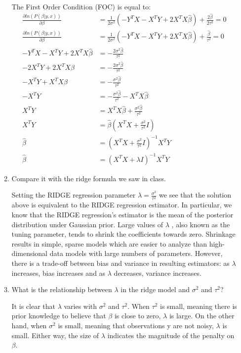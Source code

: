 \documentclass[12pt]{article}
\begin{document}
\begin{enumerate}
\begin{enumerate}
The First Order Condition (FOC) is equal to:
\begin{align*}
\frac{\partial ln(P(\beta|y,x))}{\partial \beta} &= \frac{1}{2\sigma^2}(-Y^{T}X - X^{T}Y + 2X^{T}X\hat\beta) + \frac{2\hat\beta}{2\tau^2} = 0 \\
\frac{\partial ln(P(\beta|y,x))}{\partial \beta} &= \frac{1}{2\sigma^2}(-Y^{T}X - X^{T}Y + 2X^{T}X\hat\beta) + \frac{\hat\beta}{\tau^2} = 0 \\
-Y^{T}X - X^{T}Y + 2X^{T}X\hat\beta &= -\frac{2\sigma^2\hat\beta}{\tau^2} \\
- 2X^{T}Y + 2X^{T}X\hat\beta &= -\frac{2\sigma^2\hat\beta}{\tau^2} \\
- X^{T}Y + X^{T}X\hat\beta &= -\frac{\sigma^2\hat\beta}{\tau^2} \\
- X^{T}Y &= -\frac{\sigma^2\hat\beta}{\tau^2} - X^{T}X\hat\beta \\
X^{T}Y &= X^{T}X\hat\beta + \frac{\sigma^2\hat\beta}{\tau^2} \\
X^{T}Y &= \hat\beta(X^{T}X + \frac{\sigma^{2}}{\tau^{2}}I)  \\
\hat\beta &= (X^{T}X + \frac{\sigma^{2}}{\tau^{2}}I)^{-1}X^{T}Y  \\
\hat\beta &= (X^{T}X + \lambda I)^{-1}X^{T}Y 
\end{align*}

    \item Compare it with the ridge formula we saw in class.
    
Setting the RIDGE regression parameter $\lambda = \frac{\sigma^{2}}{\tau^{2}}$ we see that the solution above is equivalent to the RIDGE regression estimator. In particular, we know that the RIDGE regression's estimator is the mean of the posterior distribution under Gaussian prior. Large values of $\lambda$ , also known as the tuning parameter, tends to shrink the coefficients towards zero. Shrinkage results in simple, sparse models which are easier to analyze than high-dimensional data models with large numbers of parameters. However, there is a trade-off between bias and variance in resulting estimators: as $\lambda$ increases, bias increases and as $\lambda$ decreases, variance increases. 
\\
    \item What is the relationship between $\lambda$ in the ridge model and $\sigma^2$ and $\tau^2$?
    
It is clear that $\lambda$ varies with $\sigma^2$ and $\tau^2$. When $\tau^2$ is small, meaning there is prior knowledge to believe that $\beta$ is close to zero, $\lambda$ is large. On the other hand, when $\sigma^2$ is small, meaning that observations y are not noisy, $\lambda$ is small.  Either way, the size of $\lambda$ indicates the magnitude of the penalty on $\beta$.  
\\


\end{enumerate}
\end{enumerate}
\end{document}

